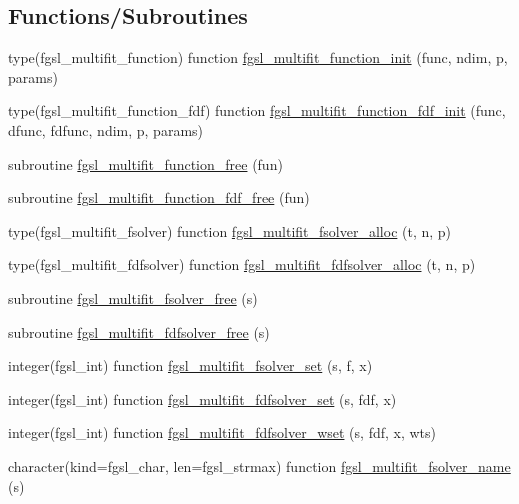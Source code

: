 \subsection*{Functions/\+Subroutines}
\begin{DoxyCompactItemize}
\item 
type(fgsl\+\_\+multifit\+\_\+function) function \hyperlink{multifit_8finc_a2e394cedc80d509b3d36075c158a5e0b}{fgsl\+\_\+multifit\+\_\+function\+\_\+init} (func, ndim, p, params)
\item 
type(fgsl\+\_\+multifit\+\_\+function\+\_\+fdf) function \hyperlink{multifit_8finc_a2dd878d64008fb31f3d9d031fd5996b7}{fgsl\+\_\+multifit\+\_\+function\+\_\+fdf\+\_\+init} (func, dfunc, fdfunc, ndim, p, params)
\item 
subroutine \hyperlink{multifit_8finc_a00bc267d2137d1f864bd2dad8cf9c1e4}{fgsl\+\_\+multifit\+\_\+function\+\_\+free} (fun)
\item 
subroutine \hyperlink{multifit_8finc_a268c4c5943960408672abc2e9688bf83}{fgsl\+\_\+multifit\+\_\+function\+\_\+fdf\+\_\+free} (fun)
\item 
type(fgsl\+\_\+multifit\+\_\+fsolver) function \hyperlink{multifit_8finc_ab65091d8504740c62c4e7524b9baf849}{fgsl\+\_\+multifit\+\_\+fsolver\+\_\+alloc} (t, n, p)
\item 
type(fgsl\+\_\+multifit\+\_\+fdfsolver) function \hyperlink{multifit_8finc_ad6618c0ee5bef46ed5dedb9a15061e4d}{fgsl\+\_\+multifit\+\_\+fdfsolver\+\_\+alloc} (t, n, p)
\item 
subroutine \hyperlink{multifit_8finc_a4edb3e095664b64c3d404361b85646b8}{fgsl\+\_\+multifit\+\_\+fsolver\+\_\+free} (s)
\item 
subroutine \hyperlink{multifit_8finc_a165ecb344b49316126c86c7b77736818}{fgsl\+\_\+multifit\+\_\+fdfsolver\+\_\+free} (s)
\item 
integer(fgsl\+\_\+int) function \hyperlink{multifit_8finc_add0161459835f3bb750e5f1b624a7431}{fgsl\+\_\+multifit\+\_\+fsolver\+\_\+set} (s, f, x)
\item 
integer(fgsl\+\_\+int) function \hyperlink{multifit_8finc_aeeaba728844c99084aa56a584dbd90d6}{fgsl\+\_\+multifit\+\_\+fdfsolver\+\_\+set} (s, fdf, x)
\item 
integer(fgsl\+\_\+int) function \hyperlink{multifit_8finc_a439edf8c3ef1ab7b93da13cec13b3943}{fgsl\+\_\+multifit\+\_\+fdfsolver\+\_\+wset} (s, fdf, x, wts)
\item 
character(kind=fgsl\+\_\+char, len=fgsl\+\_\+strmax) function \hyperlink{multifit_8finc_a1c86f8b8187449338d57229da0c9c87a}{fgsl\+\_\+multifit\+\_\+fsolver\+\_\+name} (s)

\end{DoxyCompactItemize}
